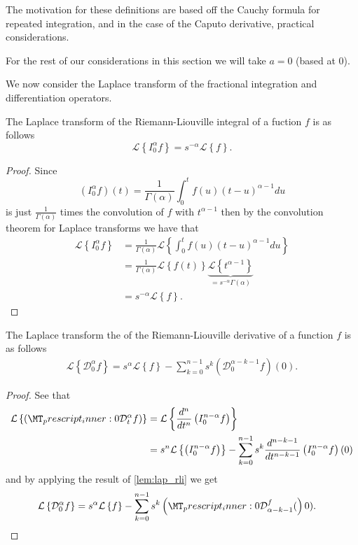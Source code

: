 The motivation for these definitions are based off the Cauchy formula for repeated integration, and in the case
of the Caputo derivative, practical considerations. \cite{Samko1993, Podlubny1999} 

For the rest of our considerations in this section we will take $ a = 0 $ (based at 0). 

We now consider the Laplace transform of the fractional integration and differentiation operators.

\begin{lemma}
\label{lem:lap_rli}
	The Laplace transform of the Riemann-Liouville integral of a fuction $ f $ is as follows
	$$
		\mathcal{L} \left\{ I_0^\alpha f \right\}  = s^{-\alpha} \mathcal{L} \left\{ f \right\}.
	$$
\end{lemma}
\begin{proof}
	Since 
	$$
		 (I_0^\alpha f)(t) = \frac{1}{\Gamma(\alpha)} \int_0^t f(u) (t-u)^{\alpha - 1} du
	$$
	is just $ \frac{1}{\Gamma(\alpha)} $ times the convolution of $ f $ with $ t^{\alpha - 1} $ then by the convolution theorem
	for Laplace transforms we have that 
	\begin{align*}
		\mathcal{L} \left\{ I_0^\alpha f \right\} &= \frac{1}{\Gamma(\alpha)} \mathcal{L} \left\{ \int_{0}^{t} f(u) (t-u)^{\alpha - 1} du \right\} \\
			&= \frac{1}{\Gamma(\alpha)} \mathcal{L} \left\{ f(t) \right\} \underbrace{\mathcal{L} \left\{ t^{\alpha - 1} \right\}}_{=s^{-\alpha} \Gamma(\alpha)} \\
			&= s^{-\alpha} \mathcal{L} \left\{ f \right\}.
	\end{align*}
\end{proof}

\begin{lemma}
\label{lem:lap_rld}
	The Laplace transform the of the Riemann-Liouville derivative of a function $ f $ is as follows
	\begin{align*}
		\mathcal{L} \left\{\mathcal{D}_0^\alpha f\right\} = s^\alpha \mathcal{L} \left\{ f \right\} - \sum_{k=0}^{n-1} s^{k} \left( \mathcal{D}_0^{\alpha-k-1} f\right)(0).
	\end{align*}
\end{lemma}
\begin{proof}
	See that
	\begin{align*}
		\laplace{ \rld{0}{t}{\alpha}{f} } &= \laplace{ \der{}{t}{n} \rli{0}{n-\alpha}{f} } \\
		&= s^n\laplace{\rli{0}{n-\alpha}{f}} - \sum_{k=0}^{n-1} s^k \der{}{t}{n-k-1} \rli{0}{n-\alpha}{f}(0)
	\end{align*}
	and by applying the result of \ref{lem:lap_rli} we get
	\begin{align*}
			\mathcal{L} \left\{\mathcal{D}_0^\alpha f\right\} &= s^\alpha \laplace{f} - \sum_{k=0}^{n-1} s^{k} \rld{0}{\alpha - k - 1}{f}(0). 
	\end{align*}
\end{proof}

